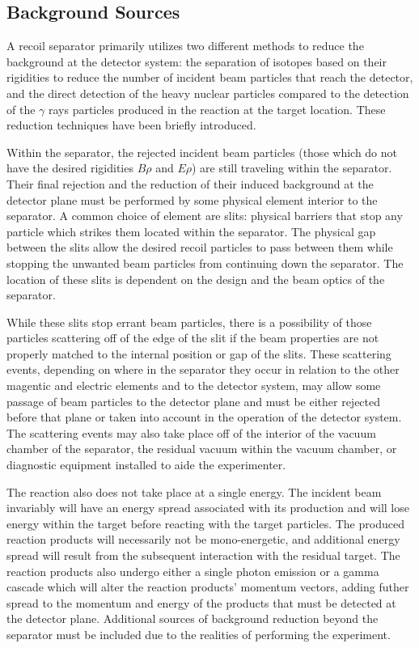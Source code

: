 \subsection{Background Sources}

A recoil separator primarily utilizes two different methods to reduce the
background at the detector system: the separation of isotopes based on their
rigidities to reduce the number of incident beam particles that reach the
detector, and the direct detection of the heavy nuclear particles compared to
the detection of the $\gamma$ rays particles produced in the reaction at the
target location. These reduction techniques have been briefly introduced.

Within the separator, the rejected incident beam particles (those which do not
have the desired rigidities $B\rho$ and $E\rho$) are still traveling within
the separator. Their final rejection and the reduction of their induced
background at the detector plane must be performed by some physical element
interior to the separator. A common choice of element are slits: physical
barriers that stop any particle which strikes them located within the
separator. The physical gap between the slits allow the desired recoil
particles to pass between them while stopping the unwanted beam particles from
continuing down the separator. The location of these slits is dependent on the
design and the beam optics of the separator.

While these slits stop errant beam particles, there is a possibility of those
particles scattering off of the edge of the slit if the beam properties are
not properly matched to the internal position or gap of the slits. These
scattering events, depending on where in the separator they occur in relation
to the other magentic and electric elements and to the detector system, may
allow some passage of beam particles to the detector plane and must be either
rejected before that plane or taken into account in the operation of the
detector system. The scattering events may also take place off of the interior
of the vacuum chamber of the separator, the residual vacuum within the vacuum
chamber, or diagnostic equipment installed to aide the experimenter.

The reaction also does not take place at a single energy. The incident beam
invariably will have an energy spread associated with its production and will
lose energy within the target before reacting with the target particles. The
produced reaction products will necessarily not be mono-energetic, and
additional energy spread will result from the subsequent interaction with the
residual target. The reaction products also undergo either a single photon
emission or a gamma cascade which will alter the reaction products' momentum
vectors, adding futher spread to the momentum and energy of the products that
must be detected at the detector plane. Additional sources of background
reduction beyond the separator must be included due to the realities of
performing the experiment.


